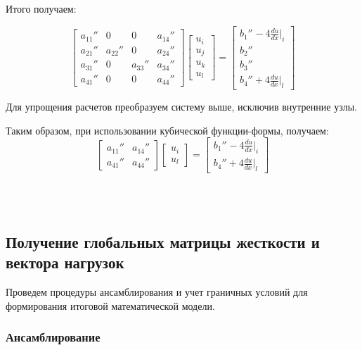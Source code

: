 Итого получаем:

$$ \begin{bmatrix}
a_{11}''     &  0  & 0  &  a_{14}''\\
a_{21}''     &  a_{22}''  & 0  &  a_{24}''\\
a_{31}''     &  0  &  a_{33}'' &  a_{34}''\\
a_{41}''    &  0  & 0  &  a_{44}''
\end{bmatrix}
\begin{bmatrix}
u_i \\
u_j \\
u_k\\
u_l
\end{bmatrix} =
\begin{bmatrix}
b_1'' ^{}   -4  \frac{du}{dx}|_i \\
b_2''\\
b_3''\\
b_4''   +4  \frac{du}{dx}|_l
\end{bmatrix}$$

Для упрощения расчетов преобразуем систему выше, исключив внутренние узлы.


Таким образом, при использовании кубической функции-формы,  получаем:
$$ \begin{bmatrix}
a_{11}''     &   a_{14}''\\
a_{41}''     &    a_{44}''
\end{bmatrix}
\begin{bmatrix}
u_i \\
u_l
\end{bmatrix} =
\begin{bmatrix}
b_{1}'' ^{}   -4  \frac{du}{dx}|_i \\
b_4''   +4  \frac{du}{dx}|_l
\end{bmatrix}$$

~\\
~\\


\subsection{Получение глобальных матрицы жесткости и вектора нагрузок}

Проведем процедуры ансамблирования и учет граничных условий для формирования итоговой математической модели.

\subsubsection{Ансамблирование}


